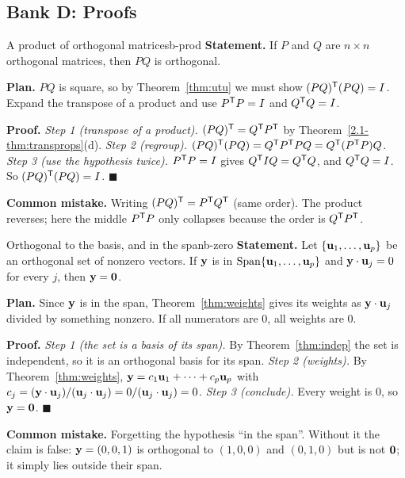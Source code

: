 \documentclass[11pt]{article}
\begin{document}
\subsection*{Bank D: Proofs}
\begin{exmp}{A product of orthogonal matrices}{b-prod}
\textbf{Statement.} If $P$ and $Q$ are $n\times n$ orthogonal matrices, then $PQ$ is orthogonal.

\textbf{Plan.} $PQ$ is square, so by Theorem~\ref{thm:utu} we must show $(PQ)^{\mathsf T}(PQ)=I$. Expand the transpose of a product and use $P^{\mathsf T} P=I$ and $Q^{\mathsf T} Q=I$.

\textbf{Proof.}
\emph{Step 1 (transpose of a product).} $(PQ)^{\mathsf T}=Q^{\mathsf T} P^{\mathsf T}$ by Theorem~\ref{2.1-thm:transprops}(d).
\emph{Step 2 (regroup).} $(PQ)^{\mathsf T}(PQ)=Q^{\mathsf T} P^{\mathsf T} PQ=Q^{\mathsf T}(P^{\mathsf T} P)Q$.
\emph{Step 3 (use the hypothesis twice).} $P^{\mathsf T} P=I$ gives $Q^{\mathsf T} IQ=Q^{\mathsf T} Q$, and $Q^{\mathsf T} Q=I$. So $(PQ)^{\mathsf T}(PQ)=I$. \qquad$\blacksquare$

\textbf{Common mistake.} Writing $(PQ)^{\mathsf T}=P^{\mathsf T} Q^{\mathsf T}$ (same order). The product reverses; here the middle $P^{\mathsf T} P$ only collapses because the order is $Q^{\mathsf T} P^{\mathsf T}$.
\end{exmp}

\begin{exmp}{Orthogonal to the basis, and in the span}{b-zero}
\textbf{Statement.} Let $\{\mathbf{u}_1,\dots,\mathbf{u}_p\}$ be an orthogonal set of nonzero vectors. If $\mathbf{y}$ is in $\operatorname{Span}\{\mathbf{u}_1,\dots,\mathbf{u}_p\}$ and $\mathbf{y}\cdot\mathbf{u}_j=0$ for every $j$, then $\mathbf{y}=\mathbf{0}$.

\textbf{Plan.} Since $\mathbf{y}$ is in the span, Theorem~\ref{thm:weights} gives its weights as $\mathbf{y}\cdot\mathbf{u}_j$ divided by something nonzero. If all numerators are $0$, all weights are $0$.

\textbf{Proof.}
\emph{Step 1 (the set is a basis of its span).} By Theorem~\ref{thm:indep} the set is independent, so it is an orthogonal basis for its span.
\emph{Step 2 (weights).} By Theorem~\ref{thm:weights}, $\mathbf{y}=c_1\mathbf{u}_1+\cdots+c_p\mathbf{u}_p$ with $c_j=(\mathbf{y}\cdot\mathbf{u}_j)/(\mathbf{u}_j\cdot\mathbf{u}_j)=0/(\mathbf{u}_j\cdot\mathbf{u}_j)=0$.
\emph{Step 3 (conclude).} Every weight is $0$, so $\mathbf{y}=\mathbf{0}$. \qquad$\blacksquare$

\textbf{Common mistake.} Forgetting the hypothesis ``in the span''. Without it the claim is false: $\mathbf{y}=(0,0,1)$ is orthogonal to $(1,0,0)$ and $(0,1,0)$ but is not $\mathbf{0}$; it simply lies outside their span.
\end{exmp}
\end{document}
